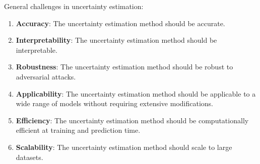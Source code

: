 








\iffalse

General challenges in uncertainty estimation:
\begin{enumerate}
    \item \textbf{Accuracy}: The uncertainty estimation method should be accurate.
    \item \textbf{Interpretability}: The uncertainty estimation method should be interpretable.
    \item \textbf{Robustness}: The uncertainty estimation method should be robust to adversarial attacks.
    \item \textbf{Applicability}: The uncertainty estimation method should be applicable to a wide range of models without requiring extensive modifications.
    \item \textbf{Efficiency}: The uncertainty estimation method should be computationally efficient at training and prediction time.
    \item \textbf{Scalability}: The uncertainty estimation method should scale to large datasets.
\end{enumerate}







